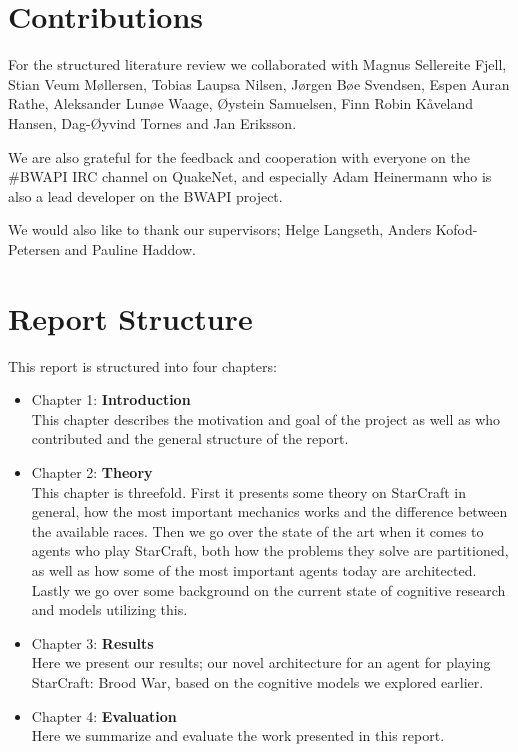 \section{Contributions}
For the structured literature review we collaborated with Magnus Sellereite
Fjell, Stian Veum M{\o}llersen, Tobias Laupsa Nilsen, J{\o}rgen B{\o}e Svendsen,
Espen Auran Rathe, Aleksander Lun{\o}e Waage, {\O}ystein Samuelsen, Finn Robin
K{\aa}veland Hansen, Dag-{\O}yvind Tornes and Jan Eriksson.

We are also grateful for the feedback and cooperation with everyone on the
\#BWAPI IRC channel on QuakeNet, and especially Adam Heinermann who is also a
lead developer on the BWAPI project.

We would also like to thank our supervisors; Helge Langseth, Anders
Kofod-Petersen and Pauline Haddow.

\section{Report Structure}
This report is structured into four chapters:
\begin{itemize}
\item Chapter 1: \textbf{Introduction} \\
This chapter describes the motivation and goal of the project as well as who contributed and the general structure of the report.
\item Chapter 2: \textbf{Theory} \\
This chapter is threefold. First it presents some theory on StarCraft in
general, how the most important mechanics works and the difference between the
available races. Then we go over the state of the art when it comes to agents
who play StarCraft, both how the problems they solve are partitioned, as well
as how some of the most important agents today are architected. Lastly we go
over some background on the current state of cognitive research and models
utilizing this.
\item Chapter 3: \textbf{Results} \\
Here we present our results; our novel architecture for an agent for playing
StarCraft: Brood War, based on the cognitive models we explored earlier.
\item Chapter 4: \textbf{Evaluation} \\
Here we summarize and evaluate the work presented in this report.


\end{itemize}